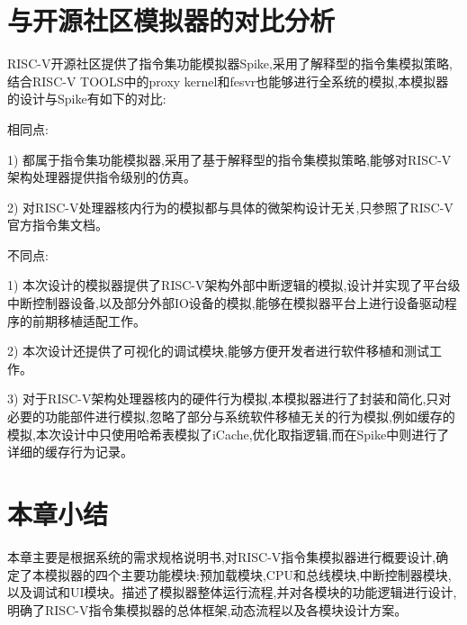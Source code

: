 \section{与开源社区模拟器的对比分析}
RISC-V开源社区提供了指令集功能模拟器Spike,采用了解释型的指令集模拟策略,结合RISC-V TOOLS中的proxy kernel和fesvr也能够进行全系统的模拟,本模拟器的设计与Spike有如下的对比:


相同点:

1) 都属于指令集功能模拟器,采用了基于解释型的指令集模拟策略,能够对RISC-V架构处理器提供指令级别的仿真。


2) 对RISC-V处理器核内行为的模拟都与具体的微架构设计无关,只参照了RISC-V官方指令集文档。

不同点:

1) 本次设计的模拟器提供了RISC-V架构外部中断逻辑的模拟,设计并实现了平台级中断控制器设备,以及部分外部IO设备的模拟,能够在模拟器平台上进行设备驱动程序的前期移植适配工作。

2) 本次设计还提供了可视化的调试模块,能够方便开发者进行软件移植和测试工作。

3) 对于RISC-V架构处理器核内的硬件行为模拟,本模拟器进行了封装和简化,只对必要的功能部件进行模拟,忽略了部分与系统软件移植无关的行为模拟,例如缓存的模拟,本次设计中只使用哈希表模拟了iCache,优化取指逻辑,而在Spike中则进行了详细的缓存行为记录。


\section{本章小结}
本章主要是根据系统的需求规格说明书,对RISC-V指令集模拟器进行概要设计,确定了本模拟器的四个主要功能模块:预加载模块,CPU和总线模块,中断控制器模块,以及调试和UI模块。描述了模拟器整体运行流程,并对各模块的功能逻辑进行设计,明确了RISC-V指令集模拟器的总体框架,动态流程以及各模块设计方案。